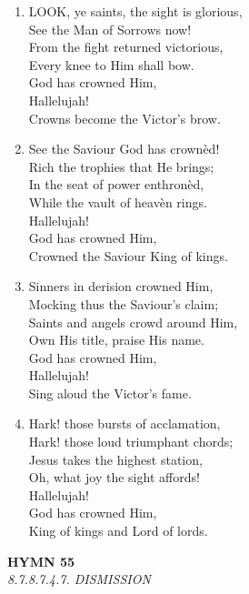 \begin{enumerate}
    \item LOOK, ye saints, the sight is glorious, \\
        See the Man of Sorrows now! \\
        From the fight returned victorious, \\
        Every knee to Him shall bow. \\
        God has crowned Him, \\
        Hallelujah! \\
        Crowns become the Victor's brow.

    \item See the Saviour God has crown\`ed! \\
        Rich the trophies that He brings; \\
        In the seat of power enthron\`ed, \\
        While the vault of heav\`en rings. \\
        Hallelujah! \\
        God has crowned Him, \\
        Crowned the Saviour King of kings.

    \item Sinners in derision crowned Him, \\
        Mocking thus the Saviour's claim; \\
        Saints and angels crowd around Him, \\
        Own His title, praise His name. \\
        God has crowned Him, \\
        Hallelujah! \\
        Sing aloud the Victor's fame.

    \item Hark! those bursts of acclamation, \\
        Hark! those loud triumphant chords; \\
        Jesus takes the highest station, \\
        Oh, what joy the sight affords! \\
        Hallelujah! \\
        God has crowned Him, \\
        King of kings and Lord of lords.

\end{enumerate}

\newpage
\begin{center}
    {\Large \textbf{HYMN 55}}
    \\
    \textit{8.7.8.7.4.7. DISMISSION}
\end{center}
\vspace{1em}


